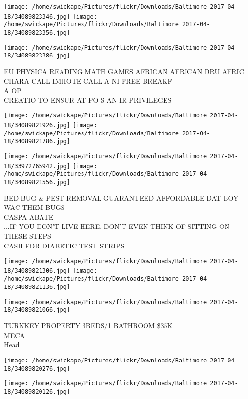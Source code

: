 \documentclass[10pt,letterpaper]{article}
\begin{document}
\texttt{[image: /home/swickape/Pictures/flickr/Downloads/Baltimore 2017-04-18/34089823346.jpg]}
\texttt{[image: /home/swickape/Pictures/flickr/Downloads/Baltimore 2017-04-18/34089823356.jpg]}

\vspace{0.25in}
\texttt{[image: /home/swickape/Pictures/flickr/Downloads/Baltimore 2017-04-18/34089823386.jpg]}

EU PHYSICA READING MATH GAMES AFRICAN AFRICAN DRU AFRIC CHARA CALL IMHOTE CALL A NI FREE BREAKF\\
A OP\\
CREATIO TO ENSUR AT PO S AN IR PRIVILEGES\\
\pagebreak

\texttt{[image: /home/swickape/Pictures/flickr/Downloads/Baltimore 2017-04-18/34089821926.jpg]}
\texttt{[image: /home/swickape/Pictures/flickr/Downloads/Baltimore 2017-04-18/34089821786.jpg]}

\texttt{[image: /home/swickape/Pictures/flickr/Downloads/Baltimore 2017-04-18/33972765942.jpg]}
\texttt{[image: /home/swickape/Pictures/flickr/Downloads/Baltimore 2017-04-18/34089821556.jpg]}

BED BUG \& PEST REMOVAL GUARANTEED AFFORDABLE DAT BOY WAC THEM BUGS\\
CASPA ABATE\\
...IF YOU DON'T LIVE HERE, DON'T EVEN THINK OF SITTING ON THESE STEPS\\
CASH FOR DIABETIC TEST STRIPS\\
\pagebreak

\texttt{[image: /home/swickape/Pictures/flickr/Downloads/Baltimore 2017-04-18/34089821306.jpg]}
\texttt{[image: /home/swickape/Pictures/flickr/Downloads/Baltimore 2017-04-18/34089821136.jpg]}

\vspace{0.25in}
\texttt{[image: /home/swickape/Pictures/flickr/Downloads/Baltimore 2017-04-18/34089821066.jpg]}

TURNKEY PROPERTY 3BEDS/1 BATHROOM \$35K\\
MECA\\
Head\\
\pagebreak

\texttt{[image: /home/swickape/Pictures/flickr/Downloads/Baltimore 2017-04-18/34089820276.jpg]}

\vspace{0.25in}
\texttt{[image: /home/swickape/Pictures/flickr/Downloads/Baltimore 2017-04-18/34089820126.jpg]}
\end{document}
